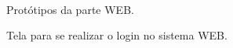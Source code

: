\begin{figure}[htb]
	\centering
	\mbox{%
		\qquad
	}
	
\end{figure}
\newpage

\begin{center}
	Protótipos da parte WEB.
\end{center}


Tela para se realizar o login no sistema WEB.

